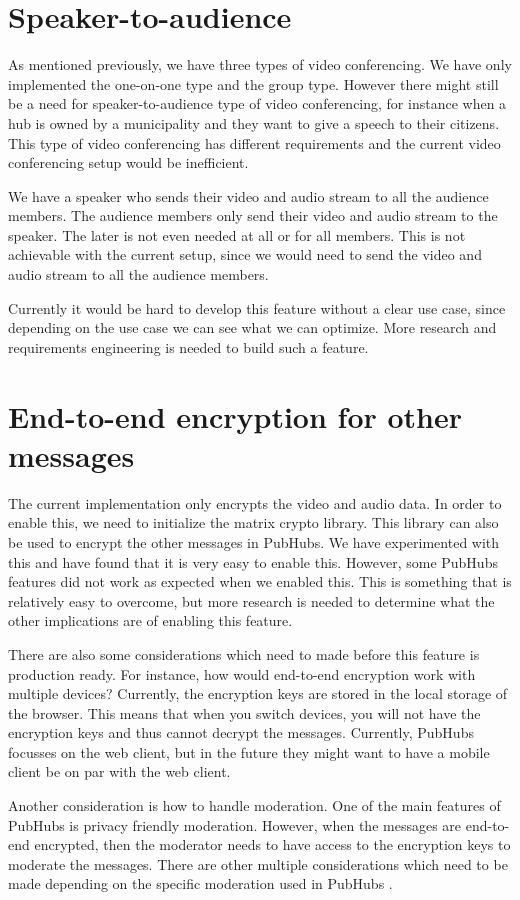 \documentclass{report}
\begin{document}
\section{Speaker-to-audience}
As mentioned previously, we have three types of video conferencing. We have only implemented the one-on-one type and
the group type. However there might still be a need for speaker-to-audience type of video conferencing, for instance
when a hub is owned by a municipality and they want to give a speech to their citizens. This type of video conferencing
has different requirements and the current video conferencing setup would be inefficient.

We have a speaker who sends their video and audio stream to all the audience members. The audience members only send
their video and audio stream to the speaker. The later is not even needed at all or for all members. This is not
achievable with the current setup, since we would need to send the video and audio stream to all the audience members.

Currently it would be hard to develop this feature without a clear use case, since depending on the use case we can
see what we can optimize. More research and requirements engineering is needed to build such a feature.

\section{End-to-end encryption for other messages}
\label{sec:encryption_of_messages}
The current implementation only encrypts the video and audio data. In order to enable this, we need to initialize the
matrix crypto library. This library can also be used to encrypt the other messages in PubHubs. We have experimented
with this and have found that it is very easy to enable this. However, some PubHubs features did not work as expected
when we enabled this. This is something that is relatively easy to overcome, but more research is needed to determine
what the other implications are of enabling this feature.

There are also some considerations which need to made before this feature is production ready.
For instance, how would end-to-end encryption work with multiple devices? Currently, the encryption keys are stored in
the local storage of the browser. This means that when you switch devices, you will not have the encryption keys and
thus cannot decrypt the messages. Currently, PubHubs focusses on the web client, but in the future they might want to
have a mobile client be on par with the web client.

Another consideration is how to handle moderation. One of the main features of PubHubs is privacy friendly moderation.
However, when the messages are end-to-end encrypted, then the moderator needs to have access to the encryption keys to
moderate the messages. There are other multiple considerations which need to be made depending on the specific
moderation used in PubHubs \cite{noauthor_group_nodate}.

\newpage


\end{document}
